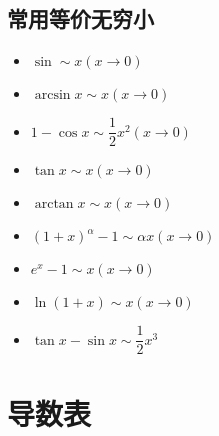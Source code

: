 \documentclass[zihao=-4,linespread=1.8,UTF8,nothm]{aytony_base}
\theoremstyle{definition}
\begin{document}
\begin{appendices}
    \subsection{常用等价无穷小}

    \begin{itemize}
        \item $\sin \sim x(x \to 0)$
        \item $\arcsin x \sim x(x \to 0)$
        \item $1 - \cos x \sim \dfrac{1}{2}x^2(x \to 0)$
        \item $\tan x \sim x(x \to 0)$
        \item $\arctan x \sim x(x \to 0)$
        \item $(1+x)^\alpha - 1 \sim \alpha x(x \to 0)$
        \item $e^x - 1 \sim x(x \to 0)$
        \item $\ln (1+x) \sim x(x \to 0)$
        \item $\tan x - \sin x \sim \dfrac{1}{2}x^3$
    \end{itemize}

    \section{导数表}


\end{appendices}
\end{document}
